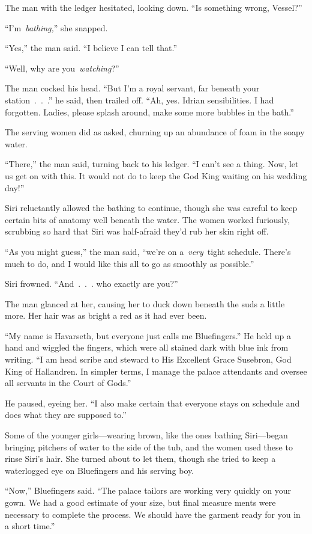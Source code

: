 The man with the ledger hesitated, looking down. “Is something wrong, Vessel?”

“I’m~\textit{bathing,}” she snapped.

“Yes,” the man said. “I believe I can tell that.”

“Well, why are you~\textit{watching}?”

The man cocked his head. “But I’m a royal servant, far beneath your station~.~.~.” he said, then trailed off. “Ah, yes. Idrian sensibilities. I had forgotten. Ladies, please splash around, make some more bubbles in the bath.”

The serving women did as asked, churning up an abundance of foam in the soapy water.

“There,” the man said, turning back to his ledger. “I can’t see a thing. Now, let us get on with this. It would not do to keep the God King waiting on his wedding day!”

Siri reluctantly allowed the bathing to continue, though she was careful to keep certain bits of anatomy well beneath the water. The women worked furiously, scrubbing so hard that Siri was half-afraid they’d rub her skin right off.

“As you might guess,” the man said, “we’re on a~\textit{very}~tight schedule. There’s much to do, and I would like this all to go as smoothly as possible.”

Siri frowned. “And~.~.~. who exactly are you?”

The man glanced at her, causing her to duck down beneath the suds a little more. Her hair was as bright a red as it had ever been.

“My name is Havarseth, but everyone just calls me Bluefingers.” He held up a hand and wiggled the fingers, which were all stained dark with blue ink from writing. “I am head scribe and steward to His Excellent Grace Susebron, God King of Hallandren. In simpler terms, I manage the palace attendants and oversee all servants in the Court of Gods.”

He paused, eyeing her. “I also make certain that everyone stays on schedule and does what they are supposed to.”

Some of the younger girls—wearing brown, like the ones bathing Siri—began bringing pitchers of water to the side of the tub, and the women used these to rinse Siri’s hair. She turned about to let them, though she tried to keep a waterlogged eye on Bluefingers and his serving boy.

“Now,” Bluefingers said. “The palace tailors are working very quickly on your gown. We had a good estimate of your size, but final measure ments were necessary to complete the process. We should have the garment ready for you in a short time.”

